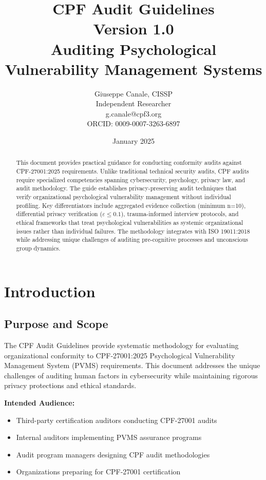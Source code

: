 \documentclass[11pt,a4paper]{article}
\title{\textbf{CPF Audit Guidelines}\\
\large Version 1.0\\
\large Auditing Psychological Vulnerability Management Systems}
\author{Giuseppe Canale, CISSP\\
\small Independent Researcher\\
\small g.canale@cpf3.org\\
\small ORCID: 0009-0007-3263-6897}
\date{January 2025}
\begin{document}
\maketitle

\begin{abstract}
This document provides practical guidance for conducting conformity audits against CPF-27001:2025 requirements. Unlike traditional technical security audits, CPF audits require specialized competencies spanning cybersecurity, psychology, privacy law, and audit methodology. The guide establishes privacy-preserving audit techniques that verify organizational psychological vulnerability management without individual profiling. Key differentiators include aggregated evidence collection (minimum n=10), differential privacy verification ($\varepsilon \leq 0.1$), trauma-informed interview protocols, and ethical frameworks that treat psychological vulnerabilities as systemic organizational issues rather than individual failures. The methodology integrates with ISO 19011:2018 while addressing unique challenges of auditing pre-cognitive processes and unconscious group dynamics.
\end{abstract}

\tableofcontents
\newpage

\section{Introduction}

\subsection{Purpose and Scope}

The CPF Audit Guidelines provide systematic methodology for evaluating organizational conformity to CPF-27001:2025 Psychological Vulnerability Management System (PVMS) requirements. This document addresses the unique challenges of auditing human factors in cybersecurity while maintaining rigorous privacy protections and ethical standards.

\textbf{Intended Audience:}
\begin{itemize}
\item Third-party certification auditors conducting CPF-27001 audits
\item Internal auditors implementing PVMS assurance programs
\item Audit program managers designing CPF audit methodologies
\item Organizations preparing for CPF-27001 certification
\end{itemize}
\end{document}
